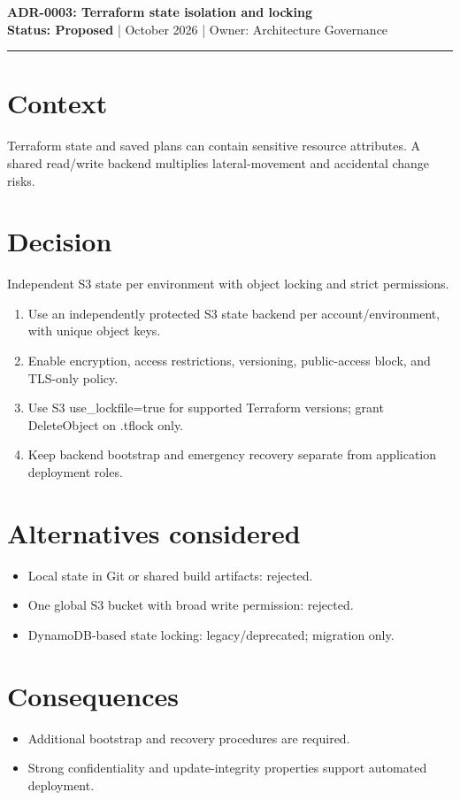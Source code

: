 \documentclass[11pt]{article}
\begin{document}
\begin{center}
{\LARGE\bfseries\color{Navy} ADR-0003: Terraform state isolation and locking }\\[4mm]
\textbf{Status: Proposed} \quad |  October 2026 \quad | \quad Owner: Architecture Governance
\end{center}
\hrule
\section*{Context}
Terraform state and saved plans can contain sensitive resource attributes. A shared read/write backend multiplies lateral-movement and accidental change risks.
\section*{Decision}
Independent S3 state per environment with object locking and strict permissions.
\begin{enumerate}[leftmargin=*]
\item Use an independently protected S3 state backend per account/environment, with unique object keys.
\item Enable encryption, access restrictions, versioning, public-access block, and TLS-only policy.
\item Use S3 use\_lockfile=true for supported Terraform versions; grant DeleteObject on .tflock only.
\item Keep backend bootstrap and emergency recovery separate from application deployment roles.
\end{enumerate}
\section*{Alternatives considered}
\begin{itemize}[leftmargin=*]
\item Local state in Git or shared build artifacts: rejected.
\item One global S3 bucket with broad write permission: rejected.
\item DynamoDB-based state locking: legacy/deprecated; migration only.
\end{itemize}
\section*{Consequences}
\begin{itemize}[leftmargin=*]
\item Additional bootstrap and recovery procedures are required.
\item Strong confidentiality and update-integrity properties support automated deployment.
\end{itemize}
\end{document}
